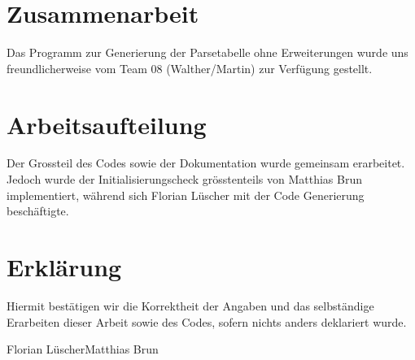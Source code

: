 \section{Zusammenarbeit}

Das Programm zur Generierung der Parsetabelle ohne Erweiterungen wurde uns freundlicherweise 
vom Team 08 (Walther/Martin) zur Verfügung gestellt.

\section{Arbeitsaufteilung}

Der Grossteil des Codes sowie der Dokumentation wurde gemeinsam erarbeitet. Jedoch wurde der 
Initialisierungscheck grösstenteils von Matthias Brun implementiert, während sich Florian Lüscher
mit der Code Generierung beschäftigte.

\section{Erklärung}

Hiermit bestätigen wir die Korrektheit der Angaben und das selbständige Erarbeiten dieser Arbeit
sowie des Codes, sofern nichts anders deklariert wurde.

\hspace{3cm}Florian Lüscher\hspace{5cm}Matthias Brun



